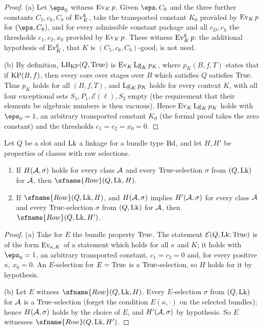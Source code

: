 \begin{proof}
(a) Let $\eps_0$ witness $\mathrm{Ev}_K\,p$. Given $\eps,C_8$ and the three further constants $C_5,c_6,C_b$ of
$\mathrm{Ev}^{\mathrm g}_K$, take the transported constant $K_0$ provided by $\mathrm{Ev}_K\,p$ for $(\eps,C_8)$, and for every
admissible constant package and all $c_D,c_h$ the thresholds $c_1,c_2,x_0$ provided by $\mathrm{Ev}_K\,p$. These witness
$\mathrm{Ev}^{\mathrm g}_K\,p$: the additional hypothesis of $\mathrm{Ev}^{\mathrm g}_K$, that $K$ is $(C_5,c_6,C_b)$-good, is
not used.

(b) By definition, $\mathrm{LB}_{\mathrm{KP}}(Q,\mathrm{True})$ is $\mathrm{Ev}_K\,\mathrm{Lg}_K\,p_K$, where $p_K(B,f,T)$ states that
if $\mathrm{KP}(B,f)$, then every core over stages over $B$ which satisfies $Q$ satisfies $\mathrm{True}$. Thus $p_K$ holds
for all $(B,f,T)$, and $\mathrm{Lg}_K\,p_K$ holds for every context $K$, with all four exceptional sets $S_1,P_1,\mathcal E(\ell),S_2$
empty (the requirement that their elements be algebraic numbers is then vacuous). Hence $\mathrm{Ev}_K\,\mathrm{Lg}_K\,p_K$ holds
with $\eps_0=1$, an arbitrary transported constant $K_0$ (the formal proof takes the zero constant) and the thresholds
$c_1=c_2=x_0=0$.
\end{proof}

\begin{lemma}\label{pf:sh-misc:rowsel}
Let $Q$ be a slot and $\mathrm{Lk}$ a linkage for a bundle type $\mathrm{Bd}$, and let $H,H'$ be properties of classes with raw
selections.
\begin{enumerate}[label=(\alph*)]
\item If $H(\mathcal{A},\sigma)$ holds for every class $\mathcal{A}$ and every $\mathrm{True}$-selection $\sigma$ from $(Q,\mathrm{Lk})$
for $\mathcal{A}$, then $\sfname{Row}(Q,\shmiscLk,H)$.
\item If $\sfname{Row}(Q,\shmiscLk,H)$, and $H(\mathcal{A},\sigma)$ implies $H'(\mathcal{A},\sigma)$ for every class $\mathcal{A}$ and
every $\mathrm{True}$-selection $\sigma$ from $(Q,\mathrm{Lk})$ for $\mathcal{A}$, then $\sfname{Row}(Q,\shmiscLk,H')$.
\end{enumerate}
\end{lemma}

\begin{proof}
(a) Take for $E$ the bundle property $\mathrm{True}$. The statement $\mathcal{E}(Q,\mathrm{Lk};\mathrm{True})$ is of the form
$\mathrm{Ev}_{\kappa,K}$ of a statement which holds for all $\kappa$ and $K$; it holds with $\eps_0=1$, an arbitrary
transported constant, $c_1=c_2=0$ and, for every positive $\kappa$, $x_0=0$. An $E$-selection for $E=\mathrm{True}$ is a
$\mathrm{True}$-selection, so $H$ holds for it by hypothesis.

(b) Let $E$ witness $\sfname{Row}(Q,\shmiscLk,H)$. Every $E$-selection $\sigma$ from $(Q,\mathrm{Lk})$ for $\mathcal{A}$ is a
$\mathrm{True}$-selection (forget the condition $E(\kappa,\cdot)$ on the selected bundles); hence $H(\mathcal{A},\sigma)$ holds
by the choice of $E$, and $H'(\mathcal{A},\sigma)$ by hypothesis. So $E$ witnesses $\sfname{Row}(Q,\shmiscLk,H')$.
\end{proof}

